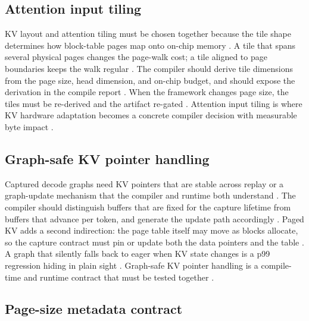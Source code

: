 \subsection{Attention input tiling}

KV layout and attention tiling must be chosen together because the tile shape determines how block-table pages map onto on-chip memory \citep{dao2022flashattention,semianalysis2024tma,memoryfloor2026}. A tile that spans several physical pages changes the page-walk cost; a tile aligned to page boundaries keeps the walk regular \citep{kwon2023vllm,memoryfloor2026}. The compiler should derive tile dimensions from the page size, head dimension, and on-chip budget, and should expose the derivation in the compile report \citep{chen2020compilerbasedhardw,patel2025llminference}. When the framework changes page size, the tiles must be re-derived and the artifact re-gated \citep{kwon2023vllm,taxbreak2026}. Attention input tiling is where KV hardware adaptation becomes a concrete compiler decision with measurable byte impact \citep{memoryfloor2026,dao2022flashattention}.

\subsection{Graph-safe KV pointer handling}

Captured decode graphs need KV pointers that are stable across replay or a graph-update mechanism that the compiler and runtime both understand \citep{nvidia2024cudagraphs,kwon2023vllm,memoryfloor2026}. The compiler should distinguish buffers that are fixed for the capture lifetime from buffers that advance per token, and generate the update path accordingly \citep{patel2025llminference,chen2020compilerbasedhardw}. Paged KV adds a second indirection: the page table itself may move as blocks allocate, so the capture contract must pin or update both the data pointers and the table \citep{kwon2023vllm,memoryfloor2026}. A graph that silently falls back to eager when KV state changes is a p99 regression hiding in plain sight \citep{patel2025llminference,taxbreak2026}. Graph-safe KV pointer handling is a compile-time and runtime contract that must be tested together \citep{nvidia2024cudagraphs,memoryfloor2026}.

\subsection{Page-size metadata contract}

